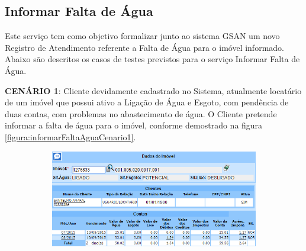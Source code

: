 \subsection{\textbf{Informar Falta de Água}}
Este serviço tem como objetivo formalizar junto ao sistema GSAN um novo Registro de Atendimento referente a Falta de Água para o imóvel informado.
Abaixo são descritos os casos de testes previstos para o serviço Informar Falta de Água.
\begin{flushleft}
	\begin{description}
		\item \textbf{CENÁRIO 1}: Cliente devidamente cadastrado no Sistema, atualmente locatário de um imóvel que possui ativo a Ligação de Água e Esgoto, com pendência de duas contas, com problemas no abastecimento de água. O Cliente pretende informar a falta de água para o imóvel, conforme demostrado na figura \ref{figura:informarFaltaAguaCenario1}.
		\begin{figure}[H]
			\centering
			\caption{\textbf{Informar Falta de Água - Cenário de Teste 1}}
			\label{figura:informarFaltaAguaCenario1}
			\begin{subfigure}[H]{\textwidth}
				\centering
				\includegraphics{figuras/cenarios/informar_falta_agua/cenario_1.PNG}
			\end{subfigure}
		\end{figure}
	\end{description}
	

\end{flushleft}
